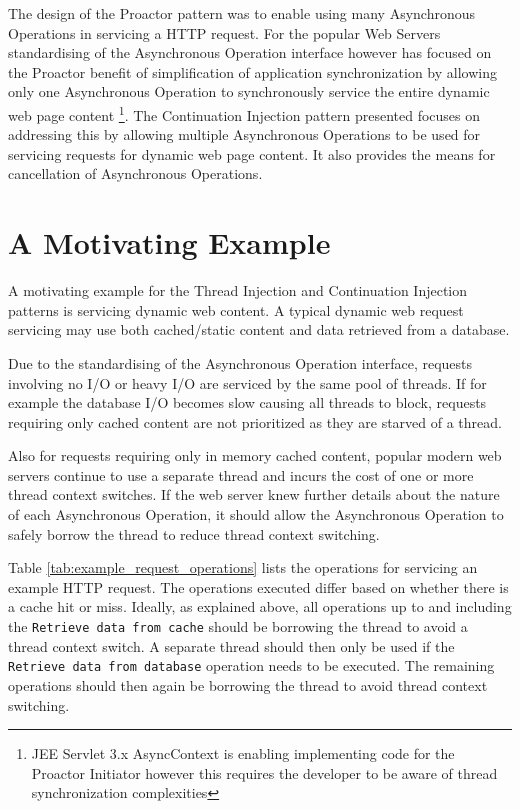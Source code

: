 \documentclass{article}
\begin{document}
The design of the Proactor pattern was to enable using many Asynchronous
Operations in servicing a HTTP request.  For the popular Web Servers
standardising of the Asynchronous Operation interface however has focused on the
Proactor benefit of simplification of application synchronization by allowing
only one Asynchronous Operation to synchronously service the entire dynamic web
page content \footnote{JEE Servlet 3.x AsyncContext is enabling implementing
code for the Proactor Initiator however this requires the developer to be aware
of thread synchronization complexities}.  The Continuation Injection pattern
presented focuses on addressing this by allowing multiple Asynchronous
Operations to be used for servicing requests for dynamic web page content. It
also provides the means for cancellation of Asynchronous Operations.


\section{A Motivating Example}

A motivating example for the Thread Injection and Continuation Injection
patterns is servicing dynamic web content.  A typical dynamic web request
servicing may use both cached/static content and data retrieved from a database.

Due to the standardising of the Asynchronous Operation interface, requests
involving no I/O or heavy I/O are serviced by the same pool of threads.
If for example the database I/O becomes slow causing all threads to block,
requests requiring only cached content are not prioritized as they are starved
of a thread.

Also for requests requiring only in memory cached content, popular modern web
servers continue to use a separate thread and incurs the cost of one or more
thread context switches.  If the web server knew further details about the
nature of each Asynchronous Operation, it should allow the Asynchronous
Operation to safely borrow the thread to reduce thread context switching.

Table \ref{tab:example_request_operations} lists the operations for servicing an
example HTTP request.  The operations executed differ based on whether there is
a cache hit or miss.  Ideally, as explained above, all operations up to and
including the \texttt{Retrieve data from cache} should be borrowing the thread
to avoid a thread context switch.  A separate thread should then only be used if
the \texttt{Retrieve data from database} operation needs to be executed.  The
remaining operations should then again be borrowing the thread to avoid thread
context switching.
\end{document}
